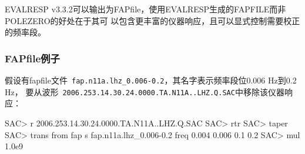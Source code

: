 EVALRESP v3.3.2可以输出为FAPfile，使用EVALRESP生成的FAPFILE而非POLEZERO的好处在于其可
以包含更丰富的仪器响应，且可以显式控制需要校正的频率段。

\subsubsection{FAPfile例子}
假设有fapfile文件~\lstinline{fap.n11a.lhz_0.006-0.2}，其名字表示频率段位0.006 Hz到0.2 Hz，
要从波形~\lstinline{2006.253.14.30.24.0000.TA.N11A..LHZ.Q.SAC}中移除该仪器响应：
\begin{SACCode}
SAC> r 2006.253.14.30.24.0000.TA.N11A..LHZ.Q.SAC
SAC> rtr
SAC> taper
SAC> trans from fap s fap.n11a.lhz_0.006-0.2 freq 0.004 0.006 0.1 0.2
SAC> mul 1.0e9
\end{SACCode}

